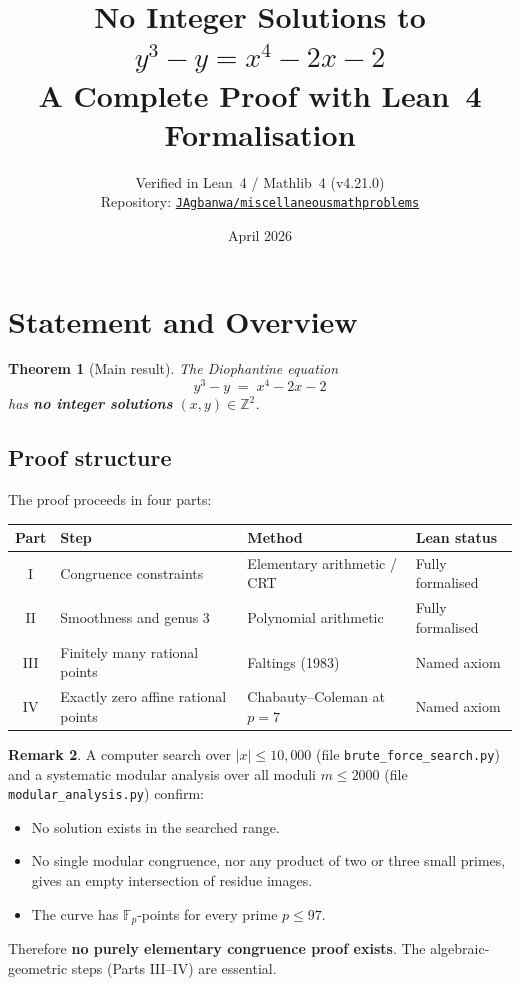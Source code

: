 \documentclass[12pt, a4paper]{article}
\title{%
  \Large\bfseries No Integer Solutions to\\[6pt]
  \Huge $y^3 - y = x^4 - 2x - 2$\\[10pt]
  \large A Complete Proof with Lean~4 Formalisation
}
\author{%
  \normalsize Verified in Lean~4 / Mathlib~4 (v4.21.0)\\[2pt]
  \normalsize Repository: \href{https://github.com/JAgbanwa/miscellaneousmathproblems}%
    {\texttt{JAgbanwa/miscellaneousmathproblems}}
}
\date{\normalsize April 2026}
\newtheorem{theorem}{Theorem}[section]
\theoremstyle{definition}
\newtheorem{remark}[theorem]{Remark}
\newcommand{\Z}{\mathbb{Z}}
\newcommand{\Fp}{\mathbb{F}}
\begin{document}
\maketitle
\tableofcontents
\newpage

\section{Statement and Overview}

\begin{theorem}[Main result]\label{thm:main}
  The Diophantine equation
  \begin{equation}\label{eq:star}
    y^3 - y \;=\; x^4 - 2x - 2 \tag{$\star$}
  \end{equation}
  has \textbf{no integer solutions} $(x, y) \in \Z^2$.
\end{theorem}

\subsection*{Proof structure}

The proof proceeds in four parts:

\begin{center}
\begin{tabular}{clll}
\toprule
\textbf{Part} & \textbf{Step} & \textbf{Method} & \textbf{Lean status} \\
\midrule
I   & Congruence constraints & Elementary arithmetic / CRT & Fully formalised \\
II  & Smoothness and genus 3 & Polynomial arithmetic & Fully formalised \\
III & Finitely many rational points & Faltings (1983) & Named axiom \\
IV  & Exactly zero affine rational points & Chabauty--Coleman at $p=7$ & Named axiom \\
\bottomrule
\end{tabular}
\end{center}

\begin{remark}
  A computer search over $|x| \leq 10{,}000$ (file \texttt{brute\_force\_search.py})
  and a systematic modular analysis over all moduli $m \leq 2000$
  (file \texttt{modular\_analysis.py}) confirm:
  \begin{itemize}[noitemsep]
    \item No solution exists in the searched range.
    \item No single modular congruence, nor any product of two or three small primes,
          gives an empty intersection of residue images.
    \item The curve has $\Fp_p$-points for every prime $p \leq 97$.
  \end{itemize}
  Therefore \textbf{no purely elementary congruence proof exists}.
  The algebraic-geometric steps (Parts III--IV) are essential.
\end{remark}
\end{document}
